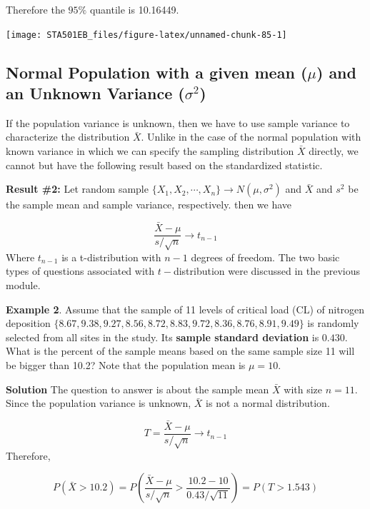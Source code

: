 \documentclass[
]{book}
\begin{document}
Therefore the \(95\%\) quantile is 10.16449.

\begin{center}\texttt{[image: STA501EB\_files/figure-latex/unnamed-chunk-85-1]} \end{center}

\hypertarget{normal-population-with-a-given-mean-mu-and-an-unknown-variance-sigma2}{%
\subsection{\texorpdfstring{Normal Population with a given mean (\(\mu\)) and an \textbf{Unknown} Variance (\(\sigma^2\))}{Normal Population with a given mean (\textbackslash mu) and an Unknown Variance (\textbackslash sigma\^{}2)}}\label{normal-population-with-a-given-mean-mu-and-an-unknown-variance-sigma2}}

If the population variance is unknown, then we have to use sample variance to characterize the distribution \(\bar{X}\). Unlike in the case of the normal population with known variance in which we can specify the sampling distribution \(\bar{X}\) directly, we cannot but have the following result based on the standardized statistic.

\textbf{Result \#2:} Let random sample \(\{X_1, X_2, \cdots, X_n \} \to N(\mu, \sigma^2)\) and \(\bar{X}\) and \(s^2\) be the sample mean and sample variance, respectively. then we have

\[
\frac{\bar{X}-\mu}{s/\sqrt{n}} \to t_{n-1}
\]
Where \(t_{n-1}\) is a t-distribution with \(n-1\) degrees of freedom. The two basic types of questions associated with \(t-\)distribution were discussed in the previous module.

\textbf{Example 2}. Assume that the sample of 11 levels of critical load (CL) of nitrogen deposition \(\{ 8.67, 9.38, 9.27, 8.56, 8.72, 8.83, 9.72, 8.36, 8.76, 8.91, 9.49 \}\) is randomly selected from all sites in the study. Its \textbf{sample standard deviation} is \(0.430\). What is the percent of the sample means based on the same sample size 11 will be bigger than 10.2? Note that the population mean is \(\mu = 10\).

\textbf{Solution} The question to answer is about the sample mean \(\bar{X}\) with size \(n = 11\). Since the population variance is unknown, \(\bar{X}\) is not a normal distribution.

\[
T = \frac{\bar{X} - \mu}{s/\sqrt{n}} \to t_{n-1}
\]
Therefore,

\[
P(\bar{X} > 10.2) = P\left( \frac{\bar{X}-\mu}{s/\sqrt{n}}  > \frac{10.2-10}{0.43/\sqrt{11}} \right) = P(T>1.543)
\]
\end{document}
